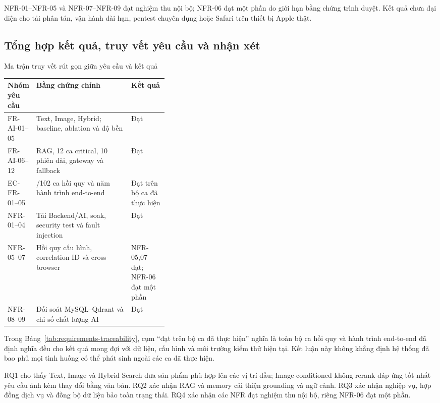 NFR-01--NFR-05 và NFR-07--NFR-09 đạt nghiệm thu nội bộ; NFR-06 đạt một phần do giới hạn bằng chứng trình duyệt. Kết quả chưa đại diện cho tải phân tán, vận hành dài hạn, pentest chuyên dụng hoặc Safari trên thiết bị Apple thật.

\subsection{Tổng hợp kết quả, truy vết yêu cầu và nhận xét}

\begingroup
\setlength{\tabcolsep}{4pt}
\renewcommand{\arraystretch}{1.05}
\begin{breakabletable}
\centering
\caption{Ma trận truy vết rút gọn giữa yêu cầu và kết quả}
\label{tab:requirements-traceability}
\small
\begin{tabularx}{\linewidth}{|>{\RaggedRight\arraybackslash}p{0.14\linewidth}|>{\RaggedRight\arraybackslash}X|>{\RaggedRight\arraybackslash}p{0.23\linewidth}|}
\hline
\textbf{Nhóm yêu cầu} & \textbf{Bằng chứng chính} & \textbf{Kết quả} \\ \hline
FR-AI-01--05 & Text, Image, Hybrid; baseline, ablation và độ bền & Đạt \\ \hline
FR-AI-06--12 & RAG, 12 ca critical, 10 phiên dài, gateway và fallback & Đạt \\ \hline
EC-FR-01--05 & 102/102 ca hồi quy và năm hành trình end-to-end & Đạt trên bộ ca đã thực hiện \\ \hline
NFR-01--04 & Tải Backend/AI, soak, security test và fault injection & Đạt \\ \hline
NFR-05--07 & Hồi quy cấu hình, correlation ID và cross-browser & NFR-05,07 đạt; NFR-06 đạt một phần \\ \hline
NFR-08--09 & Đối soát MySQL--Qdrant và chỉ số chất lượng AI & Đạt \\ \hline
\end{tabularx}
\end{breakabletable}
\endgroup

Trong Bảng~\ref{tab:requirements-traceability}, cụm ``đạt trên bộ ca đã thực hiện'' nghĩa là toàn bộ ca hồi quy và hành trình end-to-end đã định nghĩa đều cho kết quả mong đợi với dữ liệu, cấu hình và môi trường kiểm thử hiện tại. Kết luận này không khẳng định hệ thống đã bao phủ mọi tình huống có thể phát sinh ngoài các ca đã thực hiện.

RQ1 cho thấy Text, Image và Hybrid Search đưa sản phẩm phù hợp lên các vị trí đầu; Image-conditioned không rerank đáp ứng tốt nhất yêu cầu ảnh kèm thay đổi bằng văn bản. RQ2 xác nhận RAG và memory cải thiện grounding và ngữ cảnh. RQ3 xác nhận nghiệp vụ, hợp đồng dịch vụ và đồng bộ dữ liệu bảo toàn trạng thái. RQ4 xác nhận các NFR đạt nghiệm thu nội bộ, riêng NFR-06 đạt một phần.

